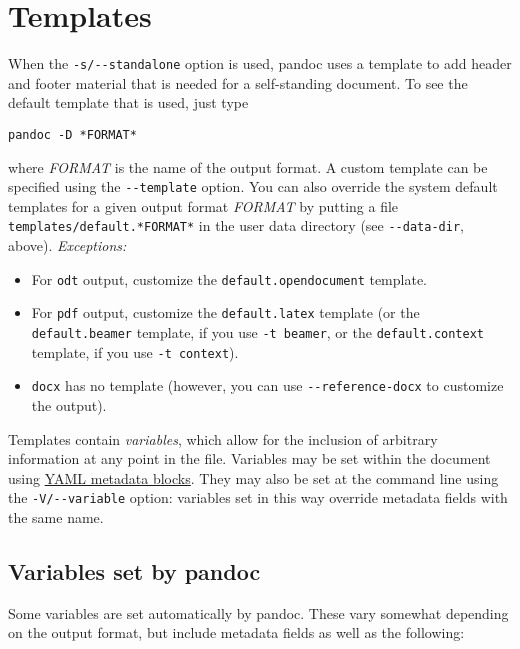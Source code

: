 \documentclass[]{article}
\providecommand{\tightlist}{%
  \setlength{\itemsep}{0pt}\setlength{\parskip}{0pt}}
\begin{document}
\hypertarget{templates}{\section{Templates}\label{templates}}

When the \texttt{-s/-\/-standalone} option is used, pandoc uses a
template to add header and footer material that is needed for a
self-standing document. To see the default template that is used, just
type

\begin{verbatim}
pandoc -D *FORMAT*
\end{verbatim}

where \emph{FORMAT} is the name of the output format. A custom template
can be specified using the \texttt{-\/-template} option. You can also
override the system default templates for a given output format
\emph{FORMAT} by putting a file \texttt{templates/default.*FORMAT*} in
the user data directory (see \texttt{-\/-data-dir}, above).
\emph{Exceptions:}

\begin{itemize}
\tightlist
\item
  For \texttt{odt} output, customize the \texttt{default.opendocument}
  template.
\item
  For \texttt{pdf} output, customize the \texttt{default.latex} template
  (or the \texttt{default.beamer} template, if you use
  \texttt{-t\ beamer}, or the \texttt{default.context} template, if you
  use \texttt{-t\ context}).
\item
  \texttt{docx} has no template (however, you can use
  \texttt{-\/-reference-docx} to customize the output).
\end{itemize}

Templates contain \emph{variables}, which allow for the inclusion of
arbitrary information at any point in the file. Variables may be set
within the document using
\protect\hyperlink{extension-yaml_metadata_block}{YAML metadata blocks}.
They may also be set at the command line using the
\texttt{-V/-\/-variable} option: variables set in this way override
metadata fields with the same name.

\subsection{Variables set by pandoc}\label{variables-set-by-pandoc}

Some variables are set automatically by pandoc. These vary somewhat
depending on the output format, but include metadata fields as well as
the following:
\end{document}
